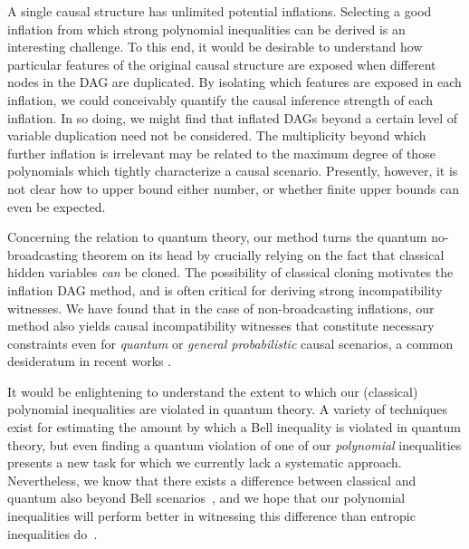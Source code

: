 
A single causal structure has unlimited potential inflations. Selecting a good inflation from which strong polynomial inequalities can be derived is an interesting challenge. To this end, it would be desirable to understand how particular features of the original causal structure are exposed when different nodes in the DAG are duplicated. By isolating which features are exposed in each inflation, we could conceivably quantify the causal inference strength of each inflation. In so doing, we might find that inflated DAGs beyond a certain level of variable duplication need not be considered. The multiplicity beyond which further inflation is irrelevant may be related to the maximum degree of those polynomials which tightly characterize a causal scenario. Presently, however, it is not clear how to upper bound either number, or whether finite upper bounds can even be expected.

Concerning the relation to quantum theory, our method turns the quantum no-broadcasting theorem \cite{NoCloningQuantum1996,NoCloningGeneral2006} on its head by crucially relying on the fact that classical hidden variables \emph{can} be cloned. The possibility of classical cloning motivates the inflation DAG method, and is often critical for deriving strong incompatibility witnesses. We have found that in the case of non-broadcasting inflations, our method also yields causal incompatibility witnesses that constitute necessary constraints even for \emph{quantum} or \emph{general probabilistic} causal scenarios, a common desideratum in recent works \cite{fritz2012bell,pusey2014gdag,Chaves2015infoquantum,ChavesNoSignalling,BeyondBellII}. 

It would be enlightening to understand the extent to which our (classical) polynomial inequalities are violated in quantum theory. A variety of techniques exist for estimating the amount by which a Bell inequality \cite{NPA2008Long,I3322NPA1} is violated in quantum theory, but even finding a quantum violation of one of our \emph{polynomial} inequalities presents a new task for which we currently lack a systematic approach. Nevertheless, we know that there exists a difference between classical and quantum also beyond Bell scenarios~\cite[Theorem~2.16]{fritz2012bell}, and we hope that our polynomial inequalities will perform better in witnessing this difference than entropic inequalities do~\cite{pusey2014gdag,Chaves2015infoquantum}.

